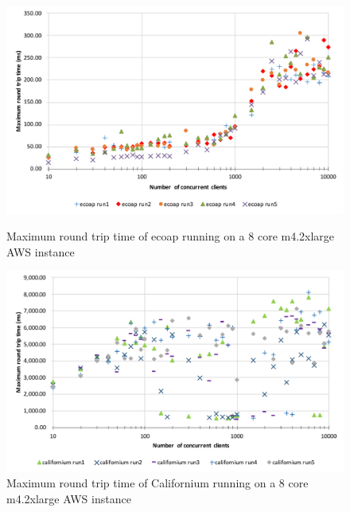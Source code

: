 \begin{figure}[!htbp]
\centering
\includegraphics[scale = 0.8]{ecoap_max_round_trip_time}
\caption{Maximum round trip time of ecoap running on a 8 core m4.2xlarge AWS instance}
\label{fig:ecoap_max_round_trip_time}
\includegraphics[scale = 0.8]{californium_max_round_trip_time}
\caption{Maximum round trip time of Californium running on a 8 core m4.2xlarge AWS instance}
\label{fig:californium_max_round_trip_time}
\end{figure}

